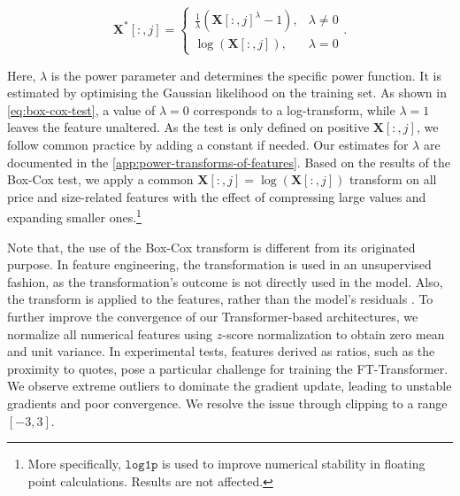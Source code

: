 \begin{equation}
    \mathbf{X}^{*}\left[:,j\right]= \begin{cases}\frac{1}{\lambda}(\mathbf{X}\left[:,j\right]^\lambda-1), & \lambda \neq 0 \\ \log (\mathbf{X}\left[:,j\right]),& \lambda=0\end{cases}.
    \label{eq:box-cox-test}
\end{equation}

Here, $\lambda$ is the power parameter and determines the specific power function. It is estimated by optimising the Gaussian likelihood on the training set. As shown in \cref{eq:box-cox-test}, a value of $\lambda=0$ corresponds to a log-transform, while $\lambda=1$ leaves the feature unaltered. As the test is only defined on positive $\mathbf{X}\left[:,j\right]$, we follow common practice by adding a constant if needed. Our estimates for $\lambda$ are documented in the \cref{app:power-transforms-of-features}. Based on the results of the Box-Cox test, we apply a common $\mathbf{X}\left[:,j\right]=\log(\mathbf{X}\left[:,j\right])$ transform on all price and size-related features with the effect of compressing large values and expanding smaller ones.\footnote{More specifically, $\mathtt{log1p}$ is used to improve numerical stability in floating point calculations. Results are not affected.}

Note that, the use of the Box-Cox transform is different from its originated purpose. In feature engineering, the transformation is used in an unsupervised fashion, as the transformation's outcome is not directly used in the model. Also, the transform is applied to the features, rather than the model's residuals \autocite[122]{kuhnFeatureEngineeringSelection2020}.
To further improve the convergence of our Transformer-based architectures, we normalize all numerical features using $z$-score normalization to obtain zero mean and unit variance.
In experimental tests, features derived as ratios, such as the proximity to quotes, pose a particular challenge for training the FT-Transformer. We observe extreme outliers to dominate the gradient update, leading to unstable gradients and poor convergence. We resolve the issue through clipping to a range $[-3,3]$.

